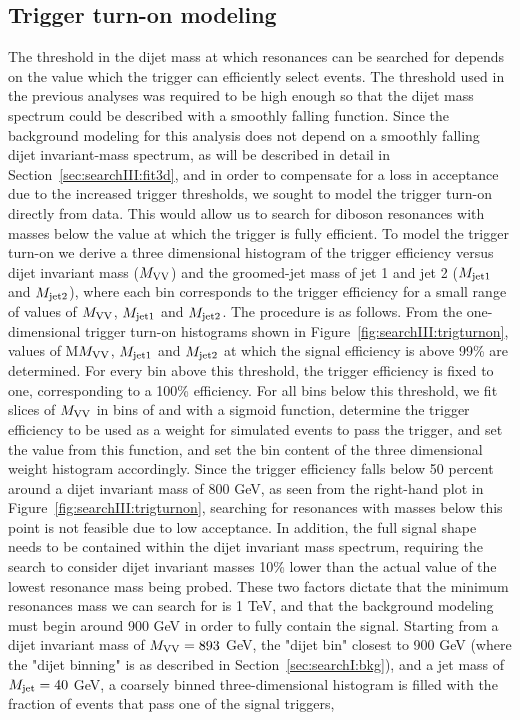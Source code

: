 \subsection{Trigger turn-on modeling}
\label{sec:searchIII:triggermodeling}
The threshold in the dijet mass at which resonances can be searched for depends on the value which the trigger can efficiently select events. The threshold used in the previous analyses was required to be high enough so that the dijet mass spectrum could be described with a smoothly falling function. Since the background modeling for this analysis does not depend on a smoothly falling dijet invariant-mass spectrum, as will be described in detail in Section~\ref{sec:searchIII:fit3d}, and in order to compensate for a loss in acceptance due to the increased trigger thresholds, we sought to model the trigger turn-on directly from data. This would allow us to search for diboson resonances with masses below the value at which the trigger is fully efficient. To model the trigger turn-on we derive a three dimensional histogram of the trigger efficiency versus dijet invariant mass ($M_{\rm VV}$) and the groomed-jet mass of jet 1 and jet 2 ($M_{\rm jet1}$ and $M_{\rm jet2}$), where each bin corresponds to the trigger efficiency for a small range of values of $M_{\rm VV}$, $M_{\rm jet1}$ and $M_{\rm jet2}$. The procedure is as follows. From the one-dimensional trigger turn-on histograms shown in Figure~\ref{fig:searchIII:trigturnon}, values of M$M_{\rm VV}$, $M_{\rm jet1}$ and $M_{\rm jet2}$ at which the signal efficiency is above 99\% are determined. For every bin above this threshold, the trigger efficiency is fixed to one, corresponding to a 100\% efficiency. For all bins below this threshold, we fit slices of $M_{\rm VV}$ in bins of \MJO and \MJT with a sigmoid function, determine the trigger efficiency to be used as a weight for simulated events to pass the trigger, and set the value from this function, and set the bin content of the three dimensional weight histogram accordingly. Since the trigger efficiency falls below 50 percent around a dijet invariant mass of 800 GeV, as seen from the right-hand plot in Figure~\ref{fig:searchIII:trigturnon}, searching for resonances with masses below this point is not feasible due to low acceptance. In addition, the full signal shape needs to be contained within the dijet invariant mass spectrum, requiring the search to consider dijet invariant masses 10\% lower than the actual value of the lowest resonance mass being probed. These two factors dictate that the minimum resonances mass we can search for is 1 TeV, and that the background modeling must begin around 900 GeV in order to fully contain the signal. Starting from a dijet invariant mass of $M_{\rm VV}=893$ GeV, the "dijet bin" closest to 900 GeV (where the "dijet binning" is as described in Section~\ref{sec:searchI:bkg}), and a jet mass of $M_{\rm jet}=40$ GeV, a coarsely binned three-dimensional histogram is filled with the fraction of events that pass one of the signal triggers,
